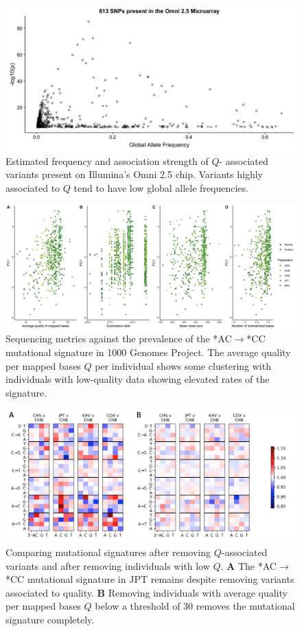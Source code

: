\documentclass[9pt,lineno]{template}
\begin{document}
\begin{figure}[h]
\includegraphics[width=12cm,keepaspectratio]{../Figures/Omni_AF.jpg}
\caption{Estimated frequency and association strength of $Q$- associated variants present on Illumina's Omni 2.5 chip. Variants highly associated to $Q$ tend to have low global allele frequencies.}
\label{Omni}
\end{figure}

\begin{figure}[h]
\includegraphics[width=12cm,keepaspectratio]{../Figures/PC1_Correlation.jpg}
\caption{Sequencing metrics against the prevalence of the  *AC${\rightarrow}$*CC mutational signature in 1000 Genomes Project. The average quality per mapped bases $Q$ per individual shows some clustering with individuals with low-quality data showing elevated rates of the signature.  }
\label{PC1_Correlation}
\end{figure}

\begin{figure}[h]
\includegraphics[width=12cm,keepaspectratio]{../Figures/MutationSpectrum_cutOff.png}

\caption{Comparing mutational signatures after removing $Q$-associated variants and after removing individuals with low $Q$.  \textbf{A} 
The  *AC${\rightarrow}$*CC mutational signature in JPT remains despite removing variants associated to quality.
\textbf{B} 
Removing individuals with average quality per mapped bases $Q$ below a threshold of 30 removes the mutational signature completely. }
\label{MutSpect}
\end{figure}
\end{document}
